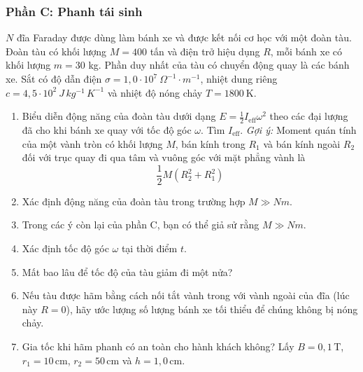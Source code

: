 \subsubsection*{Phần C: Phanh tái sinh}
\noindent $N$ đĩa Faraday được dùng làm bánh xe và được kết nối cơ học với một đoàn tàu. Đoàn tàu có khối lượng $M = 400$ tấn và điện trở hiệu dụng $R$, mỗi bánh xe có khối lượng $m = 30$ kg. Phần duy nhất của tàu có chuyển động quay là các bánh xe. Sắt có độ dẫn điện $\sigma = 1{,}0 \cdot 10^7~\Omega^{-1} \cdot m^{-1}$, nhiệt dung riêng $c = 4{,}5 \cdot 10^2~J\,kg^{-1}\,K^{-1}$ và nhiệt độ nóng chảy $T = 1800~\text{K}$.
\begin{enumerate}
  \item Biểu diễn động năng của đoàn tàu dưới dạng $E = \frac{1}{2}I_{\text{eff}}\omega^2$ theo các đại lượng đã cho khi bánh xe quay với tốc độ góc $\omega$. Tìm $I_{\text{eff}}$. \textit{Gợi ý:} Moment quán tính của một vành tròn có khối lượng $M$, bán kính trong $R_1$ và bán kính ngoài $R_2$ đối với trục quay đi qua tâm và vuông góc với mặt phẳng vành là
        \begin{equation*}
          \frac{1}{2} M(R_2^2 + R_1^2)
        \end{equation*}
  \item Xác định động năng của đoàn tàu trong trường hợp $M \gg Nm$.
  \item Trong các ý còn lại của phần C, bạn có thể giả sử rằng $M \gg Nm$.
  \item Xác định tốc độ góc $\omega$ tại thời điểm $t$.
  \item Mất bao lâu để tốc độ của tàu giảm đi một nửa?
  \item Nếu tàu được hãm bằng cách nối tắt vành trong với vành ngoài của đĩa (lúc này $R = 0$), hãy ước lượng số lượng bánh xe tối thiểu để chúng không bị nóng chảy.
  \item Gia tốc khi hãm phanh có an toàn cho hành khách không? Lấy $B = 0{,}1\,$T, $r_1 = 10\,$cm, $r_2 = 50\,$cm và $h = 1{,}0\,$cm.
\end{enumerate}
